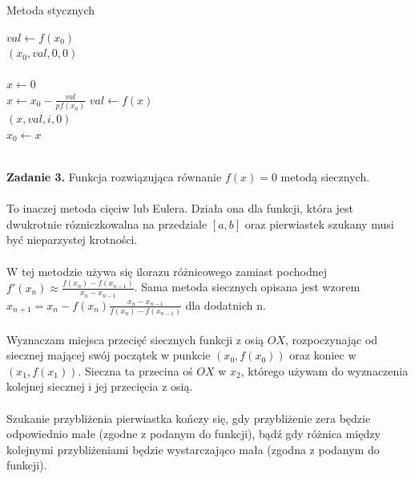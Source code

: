 \documentclass[15pt, a4paper]{article}
\begin{document}
\begin{algorithm}
\caption{Metoda stycznych}
\label{alg:metoda_stycznych}
\begin{algorithmic}[1]
    \State $val \gets f(x_0)$\\

        \State \Return $(x_0, val, 0, 0)$
    \EndIf\\

        \State \Return {}
    \EndIf\\

    \State $x \gets 0$\\

        \State $x \gets x_0 - \frac{val}{pf(x_0)}$
        \State $val \gets f(x)$\\

            \State \Return $(x, val, i, 0)$
        \EndIf\\

        \State $x_0 \gets x$
    \EndFor\\

    \State \Return {}\\
\EndFunction
\end{algorithmic}
\end{algorithm}

\vspace{0.5cm}

\noindent\hrulefill

\vspace{0.5cm}


\noindent\textbf{Zadanie 3.} Funkcja rozwiązująca równanie \( f(x) = 0 \) metodą siecznych.\\\\
\noindent To inaczej metoda cięciw lub Eulera. Działa ona dla funkcji, która jest dwukrotnie rózniczkowalna na przedziale \([a, b]\) oraz pierwiastek szukany musi być nieparzystej krotności. \\\\
\noindent W tej metodzie używa się ilorazu różnicowego zamiast pochodnej \(f'(x_n) \approx \frac{f(x_n) - f(x_{n-1})}{x_n - x_{n-1}}\). Sama metoda siecznych opisana jest wzorem \(x_{n+1} = x_n - f(x_n) \frac{x_n - x_{n-1}}{f(x_n) - f(x_{n-1})}\) dla dodatnich n.\\\\
\noindent Wyznaczam miejsca przecięć siecznych funkcji z osią \(OX\), rozpoczynając od siecznej mającej swój początek w punkcie \((x_0, f(x_0))\) oraz koniec w \((x_1, f(x_1))\). Sieczna ta przecina oś \(OX\) w \(x_2\), którego używam do wyznaczenia kolejnej siecznej i jej przecięcia z osią. \\\\
\noindent Szukanie przybliżenia pierwiastka kończy się, gdy przybliżenie zera będzie odpowiednio małe (zgodne z podanym do funkcji), bądź gdy różnica między kolejnymi przybliżeniami będzie wystarczająco mała (zgodna z podanym do funkcji).
\end{document}
